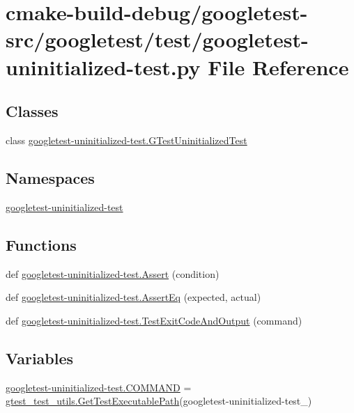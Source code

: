 \hypertarget{googletest-uninitialized-test_8py}{}\section{cmake-\/build-\/debug/googletest-\/src/googletest/test/googletest-\/uninitialized-\/test.py File Reference}
\label{googletest-uninitialized-test_8py}
\subsection*{Classes}
\begin{DoxyCompactItemize}
\item 
class \mbox{\hyperlink{classgoogletest-uninitialized-test_1_1GTestUninitializedTest}{googletest-\/uninitialized-\/test.\+G\+Test\+Uninitialized\+Test}}
\end{DoxyCompactItemize}
\subsection*{Namespaces}
\begin{DoxyCompactItemize}
\item 
 \mbox{\hyperlink{namespacegoogletest-uninitialized-test}{googletest-\/uninitialized-\/test}}
\end{DoxyCompactItemize}
\subsection*{Functions}
\begin{DoxyCompactItemize}
\item 
def \mbox{\hyperlink{namespacegoogletest-uninitialized-test_af02e731714736167bb758ba94b8ec109}{googletest-\/uninitialized-\/test.\+Assert}} (condition)
\item 
def \mbox{\hyperlink{namespacegoogletest-uninitialized-test_a8b48f5e81e60f11030082240561c7f94}{googletest-\/uninitialized-\/test.\+Assert\+Eq}} (expected, actual)
\item 
def \mbox{\hyperlink{namespacegoogletest-uninitialized-test_a70d1a3c3521654597facb5344ee1c968}{googletest-\/uninitialized-\/test.\+Test\+Exit\+Code\+And\+Output}} (command)
\end{DoxyCompactItemize}
\subsection*{Variables}
\begin{DoxyCompactItemize}
\item 
\mbox{\hyperlink{namespacegoogletest-uninitialized-test_a2526f9a60be6da67bfed64cac54d836b}{googletest-\/uninitialized-\/test.\+C\+O\+M\+M\+A\+ND}} = \mbox{\hyperlink{namespacegtest__test__utils_a89ed3717984a80ffbb7a9c92f71b86a2}{gtest\+\_\+test\+\_\+utils.\+Get\+Test\+Executable\+Path}}(\textquotesingle{}googletest-\/uninitialized-\/test\+\_\+\textquotesingle{})
\end{DoxyCompactItemize}
